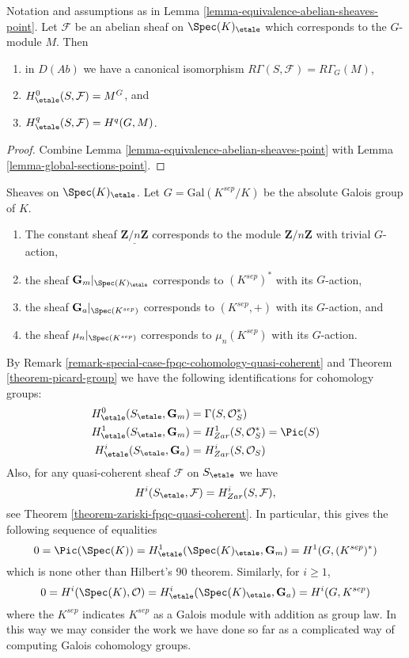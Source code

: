 \begin{lemma}
\label{lemma-compare-cohomology-point}
Notation and assumptions as in
Lemma \ref{lemma-equivalence-abelian-sheaves-point}.
Let $\mathcal{F}$ be an abelian sheaf on $\Spec(K)_\etale$
which corresponds to the $G$-module $M$.
Then
\begin{enumerate}
\item in $D(\textit{Ab})$ we have a canonical isomorphism
$R\Gamma(S, \mathcal{F}) = R\Gamma_G(M)$,
\item $H_\etale^0(S, \mathcal{F}) = M^G$, and
\item $H_\etale^q(S, \mathcal{F}) = H^q(G, M)$.
\end{enumerate}
\end{lemma}

\begin{proof}
Combine
Lemma \ref{lemma-equivalence-abelian-sheaves-point}
with
Lemma \ref{lemma-global-sections-point}.
\end{proof}

\begin{example}
\label{example-sheaves-point}
Sheaves on $\Spec(K)_\etale$.
Let $G = \text{Gal}(K^{sep}/K)$ be the absolute Galois group of $K$.
\begin{enumerate}
\item The constant sheaf $\underline{\mathbf{Z}/n\mathbf{Z}}$ corresponds to
the module $\mathbf{Z}/n\mathbf{Z}$ with trivial $G$-action,
\item the sheaf $\mathbf{G}_m|_{\Spec(K)_\etale}$ corresponds to
$(K^{sep})^*$ with its $G$-action,
\item the sheaf $\mathbf{G}_a|_{\Spec(K^{sep})}$ corresponds to
$(K^{sep}, +)$ with its $G$-action, and
\item the sheaf $\mu_n|_{\Spec(K^{sep})}$ corresponds to
$\mu_n(K^{sep})$ with its $G$-action.
\end{enumerate}
By
Remark \ref{remark-special-case-fpqc-cohomology-quasi-coherent}
and
Theorem \ref{theorem-picard-group}
we have the following identifications for cohomology groups:
\begin{align*}
H_\etale^0(S_\etale, \mathbf{G}_m) & =
\Gamma(S, \mathcal{O}_S^*) \\
H_\etale^1(S_\etale, \mathbf{G}_m) & =
H_{Zar}^1(S, \mathcal{O}_S^*) = \Pic(S) \\
H_\etale^i(S_\etale, \mathbf{G}_a) & =
H_{Zar}^i(S, \mathcal{O}_S)
\end{align*}
Also, for any quasi-coherent sheaf $\mathcal{F}$ on $S_\etale$ we have
$$
H^i(S_\etale, \mathcal{F}) = H_{Zar}^i(S, \mathcal{F}),
$$
see
Theorem \ref{theorem-zariski-fpqc-quasi-coherent}.
In particular, this gives the following sequence of equalities
$$
0 =
\Pic(\Spec(K)) =
H_\etale^1(\Spec(K)_\etale, \mathbf{G}_m) =
H^1(G, (K^{sep})^*)
$$
which is none other than Hilbert's 90 theorem. Similarly, for $i \geq 1$,
$$
0 = H^i(\Spec(K), \mathcal{O})
= H_\etale^i(\Spec(K)_\etale, \mathbf{G}_a)
= H^i(G, K^{sep})
$$
where the $K^{sep}$ indicates $K^{sep}$ as a Galois module with addition
as group law. In this way we may consider the work we have done so far as
a complicated way of computing Galois cohomology groups.
\end{example}

